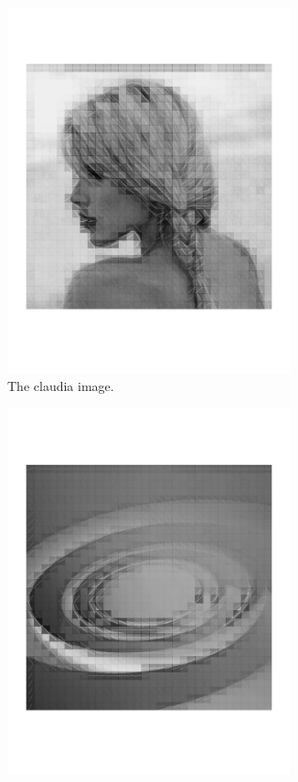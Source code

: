 \begin{figure}[h]
	\centering
	\begin{subfigure}[b]{0.49\textwidth}
		\centering
		\includegraphics[width=0.9\textwidth]{figures/directional_claudia}
		\caption{The claudia image.}
		\label{fig:claudia}
	\end{subfigure}
	\begin{subfigure}[b]{0.49\textwidth}
		\centering
		\includegraphics[width=0.9\textwidth]{figures/directional_spiral}

\end{subfigure}
\end{figure}
